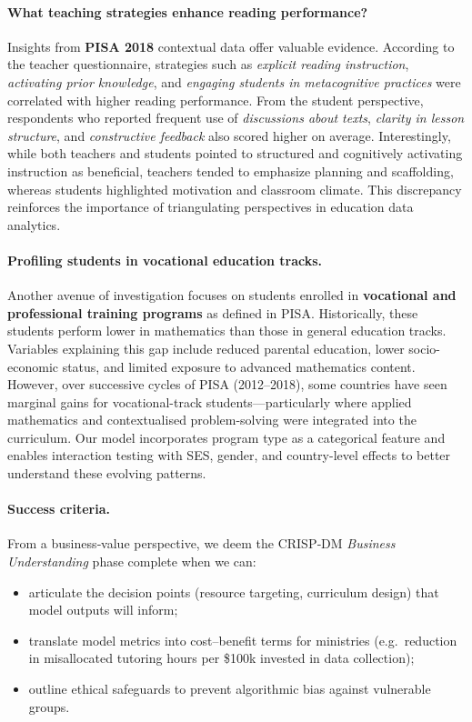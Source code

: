 \documentclass[final,5p,times,twocolumn,authoryear]{elsarticle}
\begin{document}
\paragraph{What teaching strategies enhance reading performance?}
Insights from \textbf{PISA 2018} contextual data offer valuable evidence. According to the teacher questionnaire, strategies such as \emph{explicit reading instruction}, \emph{activating prior knowledge}, and \emph{engaging students in metacognitive practices} were correlated with higher reading performance. From the student perspective, respondents who reported frequent use of \emph{discussions about texts}, \emph{clarity in lesson structure}, and \emph{constructive feedback} also scored higher on average. Interestingly, while both teachers and students pointed to structured and cognitively activating instruction as beneficial, teachers tended to emphasize planning and scaffolding, whereas students highlighted motivation and classroom climate. This discrepancy reinforces the importance of triangulating perspectives in education data analytics.

\paragraph{Profiling students in vocational education tracks.}
Another avenue of investigation focuses on students enrolled in \textbf{vocational and professional training programs} as defined in PISA. Historically, these students perform lower in mathematics than those in general education tracks. Variables explaining this gap include reduced parental education, lower socio-economic status, and limited exposure to advanced mathematics content. However, over successive cycles of PISA (2012–2018), some countries have seen marginal gains for vocational-track students—particularly where applied mathematics and contextualised problem-solving were integrated into the curriculum. Our model incorporates program type as a categorical feature and enables interaction testing with SES, gender, and country-level effects to better understand these evolving patterns.


\paragraph{Success criteria.}
From a business‑value perspective, we deem the CRISP‑DM \emph{Business Understanding} phase complete when we can:

\begin{itemize}
  \item articulate the decision points (resource targeting, curriculum design) that model outputs will inform;
  \item translate model metrics into cost–benefit terms for ministries (e.g.\ reduction in misallocated tutoring hours per \$100k invested in data collection);
  \item outline ethical safeguards to prevent algorithmic bias against vulnerable groups.
\end{itemize}
\end{document}
